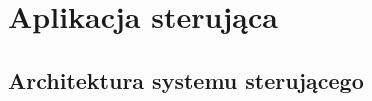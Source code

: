 \chapter{Aplikacja sterująca}
\label{cha:aplikacja_sterujaca}

\section{Architektura systemu sterującego}